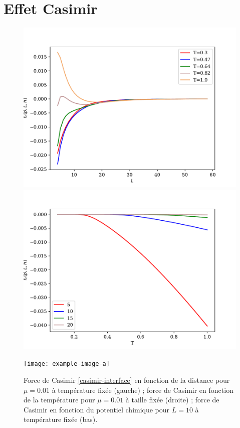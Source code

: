 \section{Effet Casimir}

\begin{figure}
	\begin{minipage}[t]{0.5\linewidth}
		\includegraphics[width=\linewidth]{chap4/casimir-temperature-zoom.pdf}
	\end{minipage}%
	\begin{minipage}[t]{0.5\linewidth}
		\includegraphics[width=\linewidth]{chap4/casimir-distance.pdf}
	\end{minipage}
	\centering
	\begin{minipage}{0.5\linewidth}
    	\texttt{[image: example-image-a]}
	\end{minipage}	
	\label{casimir-temperature}
	\caption{Force de Casimir \ref{casimir-interface} en fonction de la distance pour $\mu = 0.01$ à température fixée (gauche) ; force de Casimir en fonction de la température pour $\mu=0.01$ à taille fixée (droite) ; force de Casimir en fonction du potentiel chimique pour $L=10$ à température fixée (bas). }
\end{figure}
    
